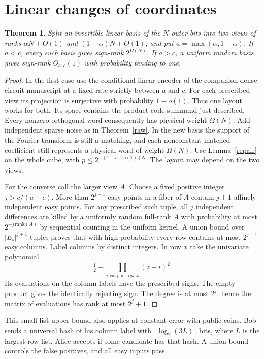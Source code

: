 \documentclass[11pt]{article}
\newtheorem{theorem}{Theorem}
\begin{document}
\section{Linear changes of coordinates}
\begin{theorem}\label{basis}
Split an invertible linear basis of the $N$ outer bits into two views of ranks $\alpha N+O(1)$ and $(1-\alpha)N+O(1)$, and put $a=\max(\alpha,1-\alpha)$. If $a<c$, every such basis gives sign-rank $2^{\Omega(N)}$. If $a>c$, a uniform random basis gives sign-rank $O_{a,c}(1)$ with probability tending to one.
\end{theorem}
\begin{proof}
In the first case use the conditional linear encoder of the companion dense-circuit manuscript \cite{dense} at a fixed rate strictly between $a$ and $c$. For each prescribed view its projection is surjective with probability $1-o(1)$. Thus one layout works for both. Its space contains the product-code summand just described. Every nonzero orthogonal word consequently has physical weight $\Omega(N)$. Add independent sparse noise as in Theorem~\ref{raw}. In the new basis the support of the Fourier transform is still a matching, and each nonconstant matched coefficient still represents a physical word of weight $\Omega(N)$. Use Lemma~\ref{repair} on the whole cube, with $p\le2^{-(1-c-o(1))N}$. The layout may depend on the two views.

For the converse call the larger view $A$. Choose a fixed positive integer $j>c/(a-c)$. More than $2^{j-1}$ easy points in a fiber of $A$ contain $j+1$ affinely independent easy points. For any prescribed such tuple, all $j$ independent differences are killed by a uniformly random full-rank $A$ with probability at most $2^{-j\,\mathrm{rank}(A)}$ by sequential counting in the uniform kernel. A union bound over $|E_s|^{j+1}$ tuples proves that with high probability every row contains at most $2^{j-1}$ easy columns. Label columns by distinct integers. In row $x$ take the univariate polynomial
\[
   \tfrac12-\prod_{i\text{ easy in row }x}(z-i)^2.
\]
Its evaluations on the column labels have the prescribed signs. The empty product gives the identically rejecting sign. The degree is at most $2^j$, hence the matrix of evaluations has rank at most $2^j+1$.
\end{proof}
This small-list upper bound also applies at constant error with public coins. Bob sends a universal hash of his column label with $\lceil\log_2(3L)\rceil$ bits, where $L$ is the largest row list. Alice accepts if some candidate has that hash. A union bound controls the false positives, and all easy inputs pass.
\end{document}
